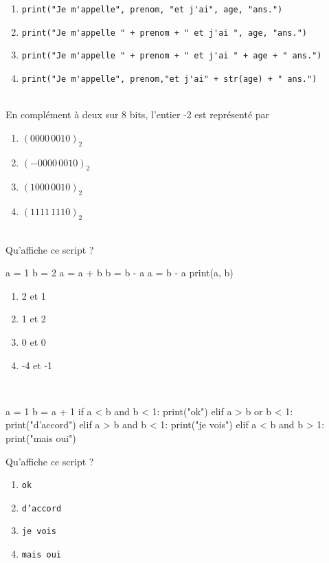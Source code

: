 \documentclass[a4paper,10pt]{article}
\begin{document}
\begin{enumerate}[\case\ ]
\item \begin{verbatim}
print("Je m'appelle", prenom, "et j'ai", age, "ans.")
\end{verbatim}
\item \begin{verbatim}
print("Je m'appelle " + prenom + " et j'ai ", age, "ans.")
\end{verbatim}
\item \begin{verbatim}
print("Je m'appelle " + prenom + " et j'ai " + age + " ans.")
\end{verbatim}
\item \begin{verbatim}
print("Je m'appelle", prenom,"et j'ai" + str(age) + " ans.")
\end{verbatim}
\end{enumerate}
\ligne\\
 

En complément à deux sur 8 bits, l'entier -2 est représenté par
\begin{enumerate}[\case\ ]
	\item 	$(0000\,0010)_2$
	\item 	$(-0000\,0010)_2$
    \item 	$(1000\,0010)_2$
    \item 	$(1111\,1110)_2$
\end{enumerate}
\ligne\\
\newpage 
Qu'affiche ce script ?

\begin{pythoncode}
a = 1
b = 2
a = a + b
b = b - a
a = b - a
print(a, b)
\end{pythoncode}

\begin{enumerate}[\case \ ]
	\item 	2 et 1
	\item 	1 et 2
    \item   0 et 0
    \item   -4 et -1
\end{enumerate}
\ligne\\

\begin{pythoncode}
a = 1
b = a + 1
if a < b and b < 1:
    print("ok")
elif a > b or b < 1:
    print("d'accord")
elif a > b and b < 1:
    print("je vois")
elif a < b and b > 1:
    print("mais oui")
\end{pythoncode}

Qu'affiche ce script ?
\begin{enumerate}[\case \ ]
	\item 	\texttt{ok}
	\item 	\texttt{d'accord}
    \item   \texttt{je vois}
    \item   \texttt{mais oui} 	
\end{enumerate}
\ligne
\end{document}

